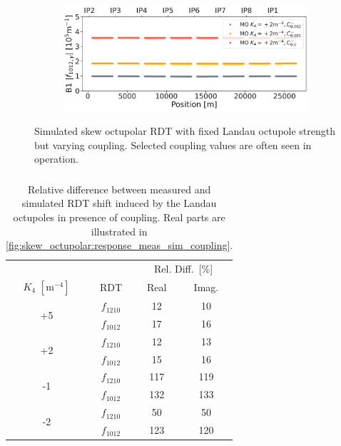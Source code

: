 \begin{figure}[!htb]
    \centering
    \begin{subfigure}{0.8\textwidth}
        \includegraphics[width=\textwidth]{./images/skew_octupoles/f1012_coupling_sim_AMP.pdf}
    \end{subfigure}
    \caption{Simulated skew octupolar RDT with fixed Landau octupole strength but varying coupling.
    Selected coupling values are often seen in operation.}
    \label{fig:skew_octupolar:sim_coupling}
\end{figure}



\FloatBarrier
\subsubsection{}

\begin{table}
    \centering
    \begin{tabular}{cccc}
    \toprule
    &&\multicolumn{2}{c}{Rel. Diff. [\%]} \\
    \cmidrule{3-4}
    $K_4$ $[\text{m}^{-4}]$ & RDT & Real & Imag. \\
    \midrule
    \multirow{2}{*}{+5}
     & $f_{1210}$ & 12  & 10  \\
     & $f_{1012}$ & 17  & 16  \\[0.5em]
    \multirow{2}{*}{+2}
     & $f_{1210}$ & 12  & 13  \\
     & $f_{1012}$ & 15  & 16  \\[0.5em]
    \multirow{2}{*}{-1}
     & $f_{1210}$ & 117 & 119 \\
     & $f_{1012}$ & 132 & 133 \\[0.5em]
    \multirow{2}{*}{-2}
     & $f_{1210}$ & 50  & 50  \\
     & $f_{1012}$ & 123 & 120 \\
    \bottomrule
    \end{tabular}
    \caption{Relative difference between measured and simulated RDT shift induced by the
    Landau octupoles in presence of coupling. Real parts are illustrated in
    \cref{fig:skew_octupolar:response_meas_sim_coupling}.}
    \label{tab:skew_octupolar:rms_ratios}
\end{table}

